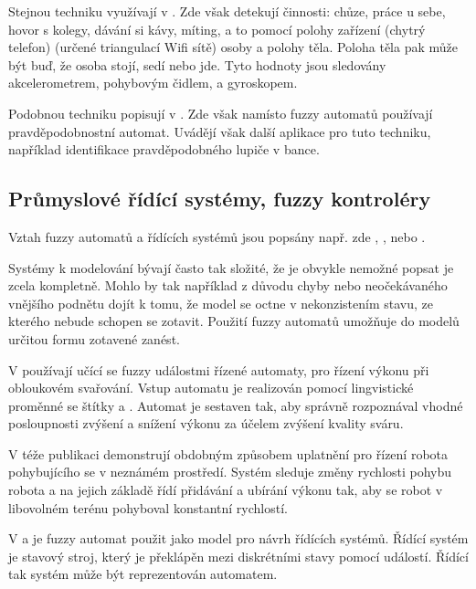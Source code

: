 \documentclass[a4paper,10pt]{article}
\begin{document}
Stejnou techniku využívají v \cite{Alv+-HumActRec+}. Zde však detekují činnosti: chůze, práce u sebe, hovor s kolegy, dávání si kávy, míting, a to pomocí polohy zařízení (chytrý telefon) (určené triangulací Wifi sítě) osoby a polohy těla. Poloha těla pak může být buď, že osoba stojí, sedí nebo jde. Tyto hodnoty jsou sledovány akcelerometrem, pohybovým čidlem, a gyroskopem. 

Podobnou techniku popisují v \cite{TurChe-MacRecHumActSur}. Zde však namísto fuzzy automatů používají pravděpodobnostní automat. Uvádějí však další aplikace pro tuto techniku, například identifikace pravděpodobného lupiče v bance.

\subsection{Průmyslové řídící systémy, fuzzy kontroléry}
Vztah fuzzy automatů a řídících systémů jsou popsány např. zde \cite{HeKinSep-DecMakFuzEnvZUsOntCon+}, \cite{Gra+-ApFuStFuOuFinMaPrRecVioOntAss}, \cite{WeeFu-FormFuzAutAppModLeaSys} nebo \cite{GraFodDri-HybFuzBooAutOntCont}. 

Systémy k modelování bývají často tak složité, že je obvykle nemožné popsat je zcela kompletně. Mohlo by tak například z důvodu chyby nebo neočekávaného vnějšího podnětu dojít k tomu, že model se octne v nekonzistením stavu, ze kterého nebude schopen se zotavit. Použití fuzzy automatů umožňuje do modelů určitou formu zotavené zanést.


V \cite{TzaRig-StaAnaAdaFuzzConSysUsiPetrNetLeaAut} používají učící se fuzzy událostmi řízené automaty, pro řízení výkonu při obloukovém svařování. Vstup automatu je realizován pomocí lingvistické proměnné  se štítky  a . Automat je sestaven tak, aby správně rozpoznával vhodné posloupnosti zvýšení a snížení výkonu za účelem zvýšení kvality sváru. 

V téže publikaci demonstrují obdobným způsobem uplatnění pro řízení robota pohybujícího se v neznámém prostředí. Systém sleduje změny rychlosti pohybu robota a na jejich základě řídí přidávání a ubírání výkonu tak, aby se robot v libovolném terénu pohyboval konstantní rychlostí.

V \cite{WeeFu-FormFuzAutAppModLeaSys} a \cite{GraFod-FuzAutIntHybConSys} je fuzzy automat použit jako model pro návrh řídících systémů. Řídící systém je stavový stroj, který je překlápěn mezi diskrétními stavy pomocí událostí. Řídící tak systém může být reprezentován automatem.
\end{document}
